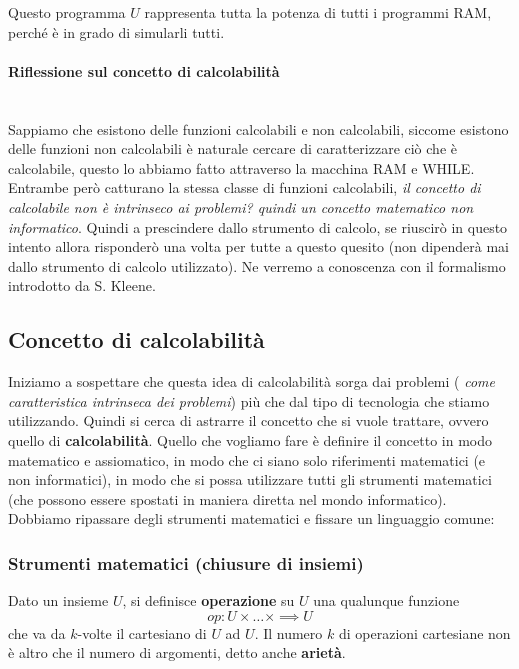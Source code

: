 \documentclass{article}
\begin{document}
Questo programma $U$ rappresenta tutta la potenza di tutti i programmi RAM, perché
è in grado di simularli tutti.

\paragraph{Riflessione sul concetto di calcolabilità}\mbox{}\\
Sappiamo che esistono delle funzioni calcolabili e non calcolabili, siccome esistono delle funzioni
non calcolabili è naturale cercare di caratterizzare ciò che è calcolabile, questo lo abbiamo
fatto attraverso la macchina RAM e WHILE. Entrambe però catturano la stessa classe di funzioni
calcolabili, \textit{il concetto di calcolabile non è intrinseco ai problemi? quindi
    un concetto matematico non informatico}.
Quindi a prescindere dallo strumento di calcolo, se riuscirò in questo intento
allora risponderò una volta per tutte a questo quesito (non dipenderà mai
dallo strumento di calcolo utilizzato). Ne verremo a conoscenza con il formalismo
introdotto da S. Kleene.

\subsection{Concetto di calcolabilità}
Iniziamo a sospettare che questa idea di calcolabilità sorga dai problemi (
\textit{come caratteristica intrinseca dei problemi}) più che dal
tipo di tecnologia che stiamo utilizzando. Quindi si cerca di astrarre il concetto che
si vuole trattare, ovvero quello di \textbf{calcolabilità}.
Quello che vogliamo fare è definire il concetto in modo matematico e assiomatico, in modo
che ci siano solo riferimenti matematici (e non informatici), in modo che si possa utilizzare
tutti gli strumenti matematici (che possono essere spostati in maniera diretta nel mondo informatico).
Dobbiamo ripassare degli strumenti matematici e fissare un linguaggio comune:

\subsubsection{Strumenti matematici (chiusure di insiemi)}
Dato un insieme $U$, si definisce \textbf{operazione} su $U$ una qualunque
funzione
$$op:U\times\dots\times\implies U$$
che va da $k$-volte il cartesiano di $U$ ad $U$. Il numero $k$ di operazioni cartesiane
non è altro che il numero di argomenti, detto anche \textbf{arietà}.
\end{document}
